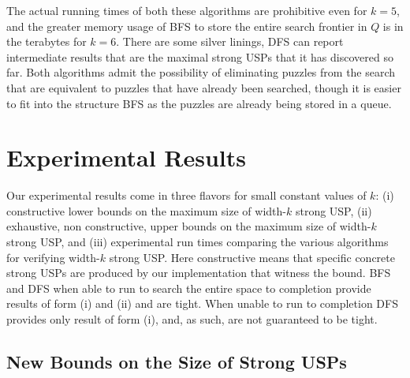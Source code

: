 \documentclass[11pt]{article}
\begin{document}
The actual running times of both these algorithms are prohibitive even
for $k = 5$, and the greater memory usage of \textsc{BFS} to store
the entire search frontier in $Q$ is in the terabytes for $k = 6$.  There
are some silver linings, \textsc{DFS} can report intermediate results
that are the maximal strong USPs that it has discovered so far.  Both
algorithms admit the possibility of eliminating puzzles from the
search that are equivalent to puzzles that have already been searched,
though it is easier to fit into the structure \textsc{BFS} as the
puzzles are already being stored in a queue.

\begin{comment}
  Not planning to discuss:
  \begin{itemize}
  \item A$^*$ + admissible heuristics.
  \item Upper bounds from A$^*$.
  \item Symmetry removal.
  \end{itemize}
\end{comment}

\section{Experimental Results}
\label{sec:results}

Our experimental results come in three flavors for small constant
values of $k$: (i) constructive lower bounds on the maximum size of
width-$k$ strong USP, (ii) exhaustive, non constructive, upper bounds
on the maximum size of width-$k$ strong USP, and (iii) experimental
run times comparing the various algorithms for verifying width-$k$
strong USP.  Here constructive means that specific concrete strong
USPs are produced by our implementation that witness the bound.
\textsc{BFS} and \textsc{DFS} when able to run to search the entire
space to completion provide results of form (i) and (ii) and are
tight.  When unable to run to completion \textsc{DFS} provides only
result of form (i), and, as such, are not guaranteed to be tight.

\subsection{New Bounds on the Size of Strong USPs}
\label{subsec:usps_found}
\end{document}
